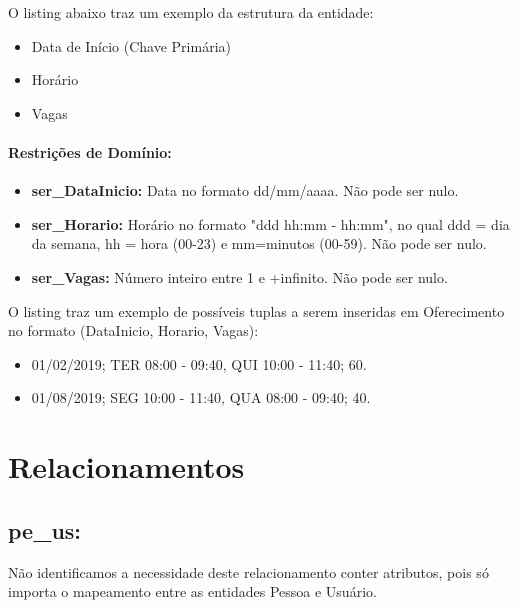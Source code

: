 \documentclass{report}
\begin{document}
  O listing abaixo traz um exemplo da estrutura da entidade:
\begin{itemize}
  \item Data de Início (Chave Primária)
  \item Horário
  \item Vagas
\end{itemize}
\paragraph{Restrições de Domínio:}
\begin{itemize}
  \item \textbf{ser\_DataInicio:} Data no formato dd/mm/aaaa. Não pode ser nulo.
  \item \textbf{ser\_Horario:} Horário no formato "ddd hh:mm - hh:mm", no qual ddd = dia da semana, hh = hora (00-23) e mm=minutos (00-59). Não pode ser nulo.
  \item \textbf{ser\_Vagas:} Número inteiro entre 1 e +infinito. Não pode ser nulo.
\end{itemize}
O listing traz um exemplo de possíveis tuplas a serem inseridas em Oferecimento no formato (DataInicio, Horario, Vagas):

\begin{itemize}
  \item 01/02/2019; TER 08:00 - 09:40, QUI 10:00 - 11:40; 60. 
  \item 01/08/2019; SEG 10:00 - 11:40, QUA 08:00 - 09:40; 40.
\end{itemize}
\section{Relacionamentos}
\subsection{pe\_us:}
Não identificamos a necessidade deste relacionamento conter atributos, pois só importa o mapeamento entre as entidades Pessoa e Usuário.
\end{document}

